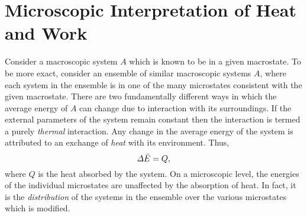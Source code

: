 \section{Microscopic Interpretation of Heat and Work}
Consider a macroscopic system $A$ which is 
known to be in a given macrostate. To be more exact, 
consider an ensemble
of similar macroscopic systems $A$, where  each system in the ensemble
is in one of the many microstates consistent with the given
macrostate. There are two fundamentally different ways
in which the average energy of $A$ can change due to interaction with its 
surroundings. If the external parameters of the system remain constant then the 
interaction is termed a purely {\em thermal}\/ interaction. Any change in the average
energy of the system is attributed to an exchange of {\em heat}\/ with its environment.
Thus,
\begin{equation}
{\mit\Delta} \bar{E} = Q,
\end{equation}
where $Q$ is the heat absorbed by the system. On a microscopic level, the
energies of the individual microstates are  unaffected by the absorption of heat.
In fact, it is the {\em distribution}\/ of the systems in the ensemble 
over the various microstates which is modified.

